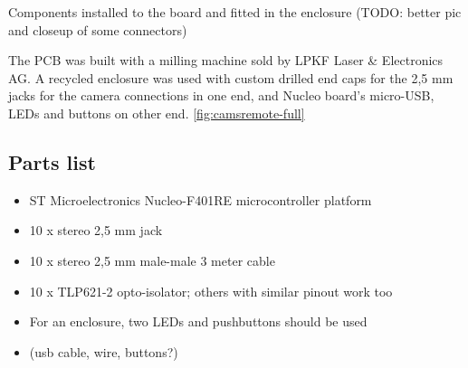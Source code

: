 {Components installed to the board and fitted in the enclosure (TODO: better pic and closeup of some connectors)}

The PCB was built with a milling machine sold by LPKF Laser \& Electronics AG.
A recycled enclosure was used with custom drilled end caps for the 2,5 mm jacks for the camera connections in one end, and Nucleo board's micro-USB, LEDs and buttons on other end.
\ref{fig:camsremote-full}

\subsection{Parts list}

\begin{itemize}
	\item ST Microelectronics Nucleo-F401RE microcontroller platform
	\item 10 x stereo 2,5 mm jack
	\item 10 x stereo 2,5 mm male-male 3 meter cable
	\item 10 x TLP621-2 opto-isolator; others with similar pinout work too
	\item For an enclosure, two LEDs and pushbuttons should be used
	\item (usb cable, wire, buttons?)
\end{itemize}
